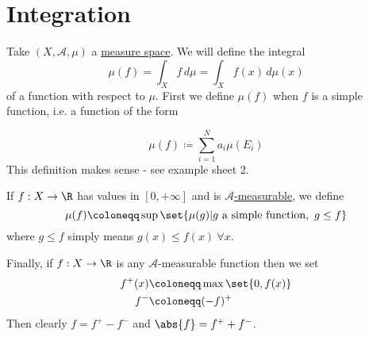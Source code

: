 \documentclass{article}
\newcommand{\1}[1]{\mathbbm{1}_{#1}}
\begin{document}
\section{Integration}
Take $(X, \mathcal{A}, \mu)$ a \hyperlink{def:measureSpace}{measure space}.
We will define the integral
\begin{equation*}
    \mu(f) = \int_X f \, d\mu = \int_X f(x) \, d\mu(x)
\end{equation*}
of a function with respect to $\mu$.
First we define $\mu(f)$ when $f$ is a simple function, i.e. a function of the form
\begin{defi}
    \begin{equation*}
        \mu(f) \coloneqq \sum_{i=1}^N a_i \mu(E_i)
    \end{equation*}
    This definition makes sense - see example sheet 2.
\end{defi}
\begin{defi}
    If $f: X \to \R$ has values in $[0, +\infty]$ and is \hyperlink{def:measurableFunctoR}{$\mathcal{A}$-measurable}, we define
    \begin{equation*}
        \mu(f) \coloneqq \sup\set{\mu(g) | g \text{ a simple function},\  g \leq f}
    \end{equation*}
    where $g \leq f$ simply means $g(x) \leq f(x) \ \forall x$.
\end{defi}
Finally, if $f: X \to \R$ is any $\mathcal{A}$-measurable function then we set
\begin{align*}
    f^+(x) &\coloneqq \max\set{0, f(x)} \\
    f^- &\coloneqq (-f)^+
\end{align*}
Then clearly $f = f^+ - f^-$ and $\abs{f} = f^+ + f^-$.

\end{document}

